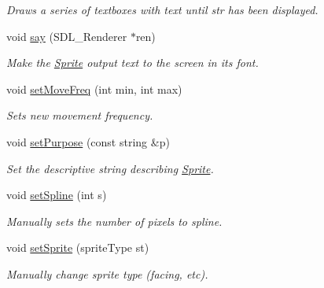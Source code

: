 \begin{DoxyCompactItemize}
\begin{DoxyCompactList}\small\item\em Draws a series of textboxes with text until str has been displayed. \end{DoxyCompactList}\item 
void \hyperlink{class_sprite_a14a138e5acf82b97c052673dffb744f6}{say} (S\+D\+L\+\_\+\+Renderer $\ast$ren)\hypertarget{class_sprite_a14a138e5acf82b97c052673dffb744f6}{}\label{class_sprite_a14a138e5acf82b97c052673dffb744f6}

\begin{DoxyCompactList}\small\item\em Make the \hyperlink{class_sprite}{Sprite} output text to the screen in its font. \end{DoxyCompactList}\item 
void \hyperlink{class_sprite_add3d25cc26178af6a14c45ac958422f2}{set\+Move\+Freq} (int min, int max)\hypertarget{class_sprite_add3d25cc26178af6a14c45ac958422f2}{}\label{class_sprite_add3d25cc26178af6a14c45ac958422f2}

\begin{DoxyCompactList}\small\item\em Sets new movement frequency. \end{DoxyCompactList}\item 
void \hyperlink{class_sprite_ac5cdeb3206d89719fc10af1146ebbaf6}{set\+Purpose} (const string \&p)\hypertarget{class_sprite_ac5cdeb3206d89719fc10af1146ebbaf6}{}\label{class_sprite_ac5cdeb3206d89719fc10af1146ebbaf6}

\begin{DoxyCompactList}\small\item\em Set the descriptive string describing \hyperlink{class_sprite}{Sprite}. \end{DoxyCompactList}\item 
void \hyperlink{class_sprite_a1ce4def2f83442fd086e38568f93c6cd}{set\+Spline} (int s)\hypertarget{class_sprite_a1ce4def2f83442fd086e38568f93c6cd}{}\label{class_sprite_a1ce4def2f83442fd086e38568f93c6cd}

\begin{DoxyCompactList}\small\item\em Manually sets the number of pixels to spline. \end{DoxyCompactList}\item 
void \hyperlink{class_sprite_aa9d0dd6123988d79c94a18f3e404d8d7}{set\+Sprite} (sprite\+Type st)\hypertarget{class_sprite_aa9d0dd6123988d79c94a18f3e404d8d7}{}\label{class_sprite_aa9d0dd6123988d79c94a18f3e404d8d7}

\begin{DoxyCompactList}\small\item\em Manually change sprite type (facing, etc). \end{DoxyCompactList}\end{DoxyCompactItemize}
